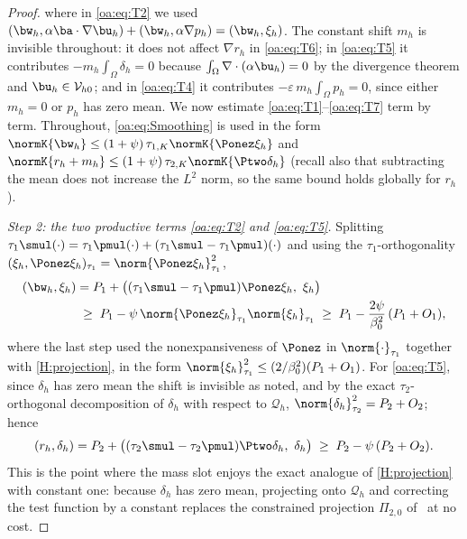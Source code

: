 \begin{proof}
where in \cref{oa:eq:T2} we used
$(\bw_h, \alpha\ba\cdot\nabla\bu_h) + (\bw_h, \alpha\nabla p_h) = (\bw_h, \xi_h)$.
The constant shift $m_h$ is invisible throughout: it does not affect $\nabla r_h$ in
\cref{oa:eq:T6}; in \cref{oa:eq:T5} it contributes $-m_h\int_\Omega \delta_h = 0$ because
$\int_\Omega \nabla\cdot(\alpha\bu_h) = 0$ by the divergence theorem and
$\bu_h \in \mathcal{V}_{h0}$; and in \cref{oa:eq:T4} it contributes
$-\varepsilon\, m_h \int_\Omega p_h = 0$, since either $m_h = 0$ or $p_h$ has zero
mean. We now estimate \cref{oa:eq:T1}--\cref{oa:eq:T7} term by term. Throughout,
\cref{oa:eq:Smoothing} is used in the form
$\normK{\bw_h} \le (1+\psi)\,\tau_{1,K}\normK{\Ponez\xi_h}$ and
$\normK{r_h + m_h} \le (1+\psi)\,\tau_{2,K}\normK{\Ptwo\delta_h}$ (recall also that
subtracting the mean does not increase the $L^2$ norm, so the same bound holds
globally for $r_h$).

\medskip\noindent\emph{Step 2: the two productive terms \cref{oa:eq:T2} and \cref{oa:eq:T5}.}
Splitting $\tau_1\smul(\cdot) = \tau_1\pmul(\cdot) + (\tau_1\smul - \tau_1\pmul)(\cdot)$
and using the $\tau_1$-orthogonality
$(\xi_h, \Ponez\xi_h)_{\tau_1} = \norm{\Ponez\xi_h}_{\tau_1}^2$,
\[
\begin{aligned}
  (\bw_h, \xi_h)
  &= P_1 + \bigl((\tau_1\smul - \tau_1\pmul)\Ponez\xi_h,\ \xi_h\bigr) \\
  &\;\ge\; P_1 - \psi\,\norm{\Ponez\xi_h}_{\tau_1}\norm{\xi_h}_{\tau_1}
  \;\ge\; P_1 - \frac{2\psi}{\beta_0^2}\,(P_1 + O_1),
\end{aligned}
\]
where the last step used the nonexpansiveness of $\Ponez$ in $\norm{\cdot}_{\tau_1}$
together with \cref{H:projection}, in the form
$\norm{\xi_h}_{\tau_1}^2 \le (2/\beta_0^2)(P_1 + O_1)$. For \cref{oa:eq:T5}, since
$\delta_h$ has zero mean the shift is invisible as noted, and by the exact
$\tau_2$-orthogonal decomposition of $\delta_h$ with respect to $\mathcal{Q}_h$,
$\norm{\delta_h}_{\tau_2}^2 = P_2 + O_2$; hence
\[
  (r_h, \delta_h)
  = P_2 + \bigl((\tau_2\smul - \tau_2\pmul)\Ptwo\delta_h,\ \delta_h\bigr)
  \;\ge\; P_2 - \psi\,(P_2 + O_2).
\]
This is the point where the mass slot enjoys the exact analogue of \cref{H:projection} with
constant one: because $\delta_h$ has zero mean, projecting onto $\mathcal{Q}_h$ and correcting
the test function by a constant replaces the constrained projection
$\Pi_{2,0}$ of~\cite{codina2008analysis} at no cost.


\end{proof}
